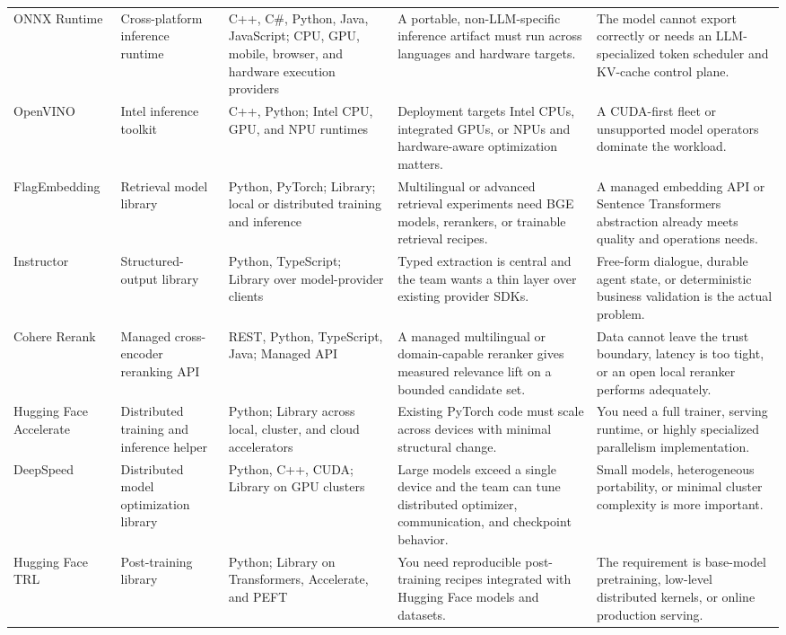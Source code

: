 \begin{longtable}{@{}p{20mm}p{22mm}p{26mm}p{46mm}p{46mm}@{}}
ONNX Runtime & Cross-platform inference runtime & C++, C\#, Python, Java, JavaScript; CPU, GPU, mobile, browser, and hardware execution providers & A portable, non-LLM-specific inference artifact must run across languages and hardware targets. & The model cannot export correctly or needs an LLM-specialized token scheduler and KV-cache control plane.\\
OpenVINO & Intel inference toolkit & C++, Python; Intel CPU, GPU, and NPU runtimes & Deployment targets Intel CPUs, integrated GPUs, or NPUs and hardware-aware optimization matters. & A CUDA-first fleet or unsupported model operators dominate the workload.\\
FlagEmbedding & Retrieval model library & Python, PyTorch; Library; local or distributed training and inference & Multilingual or advanced retrieval experiments need BGE models, rerankers, or trainable retrieval recipes. & A managed embedding API or Sentence Transformers abstraction already meets quality and operations needs.\\
Instructor & Structured-output library & Python, TypeScript; Library over model-provider clients & Typed extraction is central and the team wants a thin layer over existing provider SDKs. & Free-form dialogue, durable agent state, or deterministic business validation is the actual problem.\\
Cohere Rerank & Managed cross-encoder reranking API & REST, Python, TypeScript, Java; Managed API & A managed multilingual or domain-capable reranker gives measured relevance lift on a bounded candidate set. & Data cannot leave the trust boundary, latency is too tight, or an open local reranker performs adequately.\\
Hugging Face Accelerate & Distributed training and inference helper & Python; Library across local, cluster, and cloud accelerators & Existing PyTorch code must scale across devices with minimal structural change. & You need a full trainer, serving runtime, or highly specialized parallelism implementation.\\
DeepSpeed & Distributed model optimization library & Python, C++, CUDA; Library on GPU clusters & Large models exceed a single device and the team can tune distributed optimizer, communication, and checkpoint behavior. & Small models, heterogeneous portability, or minimal cluster complexity is more important.\\
Hugging Face TRL & Post-training library & Python; Library on Transformers, Accelerate, and PEFT & You need reproducible post-training recipes integrated with Hugging Face models and datasets. & The requirement is base-model pretraining, low-level distributed kernels, or online production serving.\\

\end{longtable}
